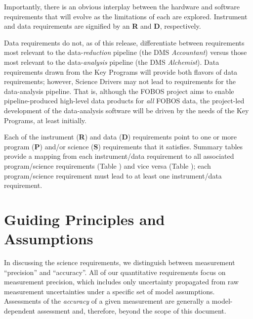 \documentclass[11pt,a4paper,twoside,onecolumn,openany,final,oldfontcommands]{memoir}
\begin{document}

\noindent Importantly, there is an obvious interplay between the hardware and software requirements that will evolve as the limitations of each are explored. Instrument and data requirements are signified by an \textbf{R} and \textbf{D}, respectively.

Data requirements do not, as of this release, differentiate between requirements most relevant to the data-\textit{reduction} pipeline (the DMS \textit{Accountant}) versus those most relevant to the data-\textit{analysis} pipeline (the DMS \textit{Alchemist}).  Data requirements drawn from the Key Programs will provide both flavors of data requirements; however, Science Drivers may not lead to requirements for the data-analysis pipeline.  That is, although the FOBOS project aims to enable pipeline-produced high-level data products for \textit{all} FOBOS data, the project-led development of the data-analysis software will be driven by the needs of the Key Programs, at least initially.

Each of the instrument (\textbf{R}) and data (\textbf{D}) requirements point to one or more program (\textbf{P}) and/or science (\textbf{S}) requirements that it satisfies.  Summary tables provide a mapping from each instrument/data requirement to all associated program/science requirements (Table ) and vice versa (Table ); each program/science requirement must lead to at least one instrument/data requirement.

\section{Guiding Principles and Assumptions}

In discussing the science requirements, we distinguish between measurement ``precision'' and ``accuracy''. All of our quantitative requirements focus on measurement precision, which includes only uncertainty propagated from raw measurement uncertainties under a specific set of model assumptions. Assessments of the \textit{accuracy} of a given measurement are generally a model-dependent assessment and, therefore, beyond the scope of this document.
\end{document}
